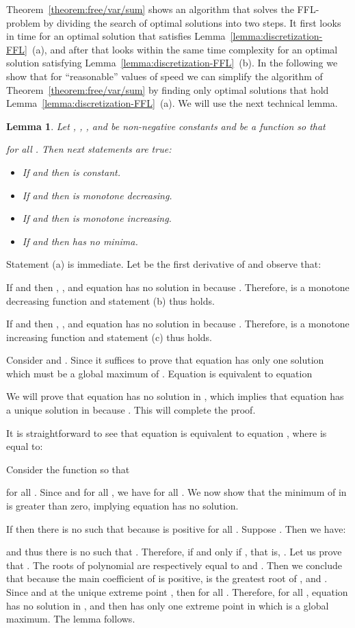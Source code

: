 \documentclass[11pt,a4paper,oneside,onecolumn]{article}
\newtheorem{lemma}[theorem]{Lemma}
\def\QED{\ensuremath{{\square}}}
\def\markatright#1{\leavevmode\unskip\nobreak\quad\hspace*{\fill}{#1}}
\newenvironment{proof}
{\begin{trivlist}\item[\hskip\labelsep{\bf Proof.}]}
{\markatright{\QED}\end{trivlist}}
\begin{document}
 Theorem~\ref{theorem:free/var/sum} shows an algorithm
that solves the FFL-problem by dividing the search of optimal
solutions into two steps. It first looks in  time for an
optimal solution that satisfies
Lemma~\ref{lemma:discretization-FFL}~(a), and after that looks
within the same time complexity for an optimal solution satisfying
Lemma~\ref{lemma:discretization-FFL}~(b). In the following we show
that for ``reasonable'' values of speed  we can simplify the
algorithm of Theorem~\ref{theorem:free/var/sum} by finding only
optimal solutions that hold
Lemma~\ref{lemma:discretization-FFL}~(a). We will use the next
technical lemma.
\begin{lemma}\label{lemma:function}
Let , , , and  be non-negative
constants and  be a
function so that

for all . Then next statements are true:
\begin{itemize}
  \item[a] If  and  then  is constant.
  \item[b] If  and  then  is monotone decreasing.
  \item[c] If  and  then  is monotone increasing.
  \item[d] If  and  then  has no minima.
\end{itemize}
\end{lemma}
\begin{proof}
Statement (a) is immediate. Let  be the first derivative of 
and observe that:

If  and  then ,
, and equation
 has no solution in  because .
Therefore,  is a monotone decreasing function and statement
(b) thus holds.

If  and  then ,
, and equation
 has no solution in  because .
Therefore,  is a monotone increasing function and statement (c) thus
holds.

Consider  and . Since  it
suffices to prove that equation  has only one solution
which must be a global maximum of .
Equation  is equivalent to equation

We will prove that equation  has no solution in
, which implies that equation 
has a unique solution in  because
. This will complete the proof.

It is straightforward to see that equation  is equivalent
to equation , where  is equal to:

Consider the function  so
that

for all . Since 
and  for all , we have
 for all . We now show that
the minimum of  in  is greater than zero,
implying equation  has no solution.

If  then there is no  such
that  because  is
positive for all . Suppose
. Then we have:

and thus there is no  such that
. Therefore,  if and
only if , that is, . Let us prove
that .
 The
roots of polynomial 
are respectively equal to
 and
. 
Then we conclude that
 because the main coefficient of
 is positive,  is the greatest root of
, and . Since  and
 at the unique extreme point , then
 for all . Therefore,  for
all , equation  has no solution in
, and then  has only one extreme point in
 which is a global maximum. The lemma
follows.
\end{proof}
\end{document}
